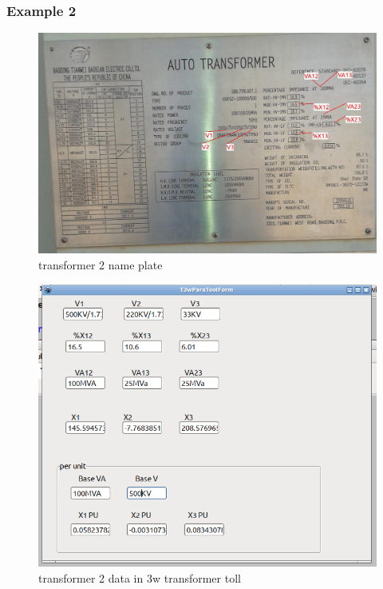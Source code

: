 \documentclass{article}
\begin{document}
\subsubsection{Example 2}
\begin{figure}[H]
	\includegraphics[width=\linewidth]{MRKTR01.jpg}
	\caption{transformer 2 name plate }
	\label{fig:TR02}
\end{figure}
\begin{figure}[H]
	\includegraphics[width=\linewidth]{MRKTR01tool.png}
	\caption{transformer 2 data in 3w transformer toll }
	\label{fig:TR02tool}
\end{figure}
\end{document}
